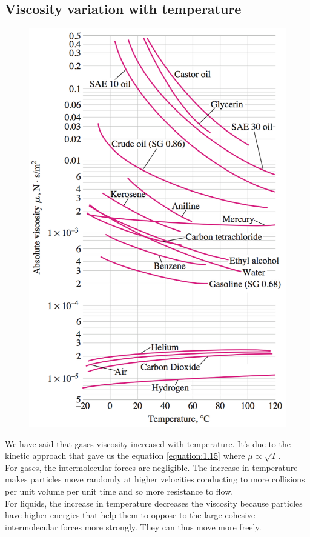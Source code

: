 \subsection{Viscosity variation with temperature}
\label{subsec:viscogas}
\begin{figure}
	\vspace{-10mm}
	\includegraphics[scale=0.25]{ch1/10}
\end{figure}
We have said that gases viscosity increased with temperature. It's due to the kinetic approach that gave us the equation \eqref{equation:1.15} where $\mu \propto \sqrt{T}$. \\
For gases, the intermolecular forces are negligible. The increase in temperature makes particles move randomly at higher velocities conducting to more collisions per unit volume per unit time and so more resistance to flow. \\
For liquids, the increase in temperature decreases the viscosity because particles have higher energies that help them to oppose to the large cohesive intermolecular forces more strongly. They can thus move more freely. 

